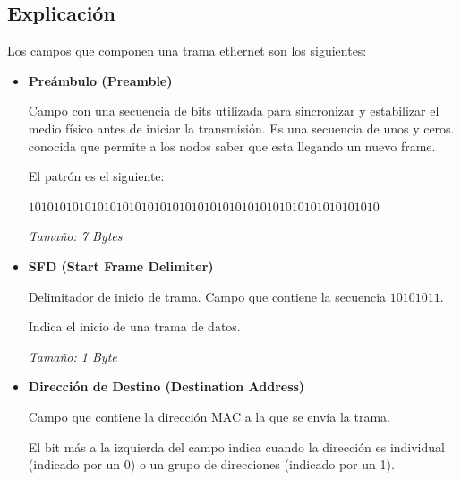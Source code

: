 \documentclass[12pt, fleqn]{report}                             %
\theoremstyle{break}                                            %
\newcommand{\Color}[2]{\textcolor{#1}{#2}}                      %
\begin{document}
            \subsection{Explicación}

                Los campos que componen una trama ethernet son los siguientes: 

                \begin{itemize}
                    
                    \item 
                        \textbf{Preámbulo (Preamble)} 

                            Campo con una secuencia de bits utilizada para sincronizar y
                            estabilizar el medio físico antes de iniciar la transmisión.
                            Es una secuencia de unos y ceros. conocida que permite a los
                            nodos saber que esta llegando un nuevo frame.

                            El patrón es el siguiente:

                            \Color{Blue900MD}{$10101010 10101010 10101010 10101010 10101010 10101010 10101010$} 

                            \emph{Tamaño: 7 Bytes} 

                    \item
                        \textbf{SFD (Start Frame Delimiter)} 

                            Delimitador de inicio de trama. Campo que contiene la
                            secuencia \Color{Red700MD}{$10101011$}.

                            Indica el inicio de una trama de datos.

                            \emph{Tamaño: 1 Byte} 

                    \item
                        \textbf{Dirección de Destino (Destination Address)}
 
                            Campo que contiene la dirección MAC a la que se envía la trama.

                            El bit más a la izquierda del campo indica cuando la dirección es individual (indicado por un 0)
                            o un grupo de direcciones (indicado por un 1).


\end{itemize}
\end{document}
